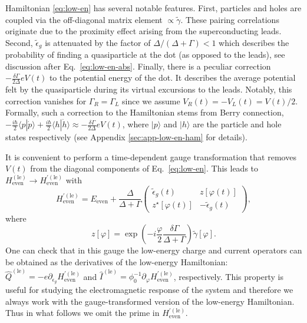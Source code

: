 \documentclass[aps,reprint,longbibliography, prb]{revtex4-2}
\begin{document}
Hamiltonian \eqref{eq:low-en} has several notable features. First, particles and holes are coupled via the off-diagonal matrix element $\propto\tilde{\gamma}$. These pairing correlations originate due to the proximity effect arising from the superconducting leads.  Second, $\tilde{\epsilon}_g$ is attenuated by the factor of $\Delta/(\Delta + \Gamma) < 1$ which describes the probability of finding a quasiparticle at the dot (as opposed to the leads), see discussion after Eq.~\eqref{eq:low-en-abs}.
Finally, there is a peculiar correction $-\frac{\delta\Gamma}{2\Delta}e V(t)$ to the potential energy of the dot. It describes the average potential felt by the quasiparticle during its virtual excursions to the leads. Notably, this correction vanishes for $\Gamma_R=\Gamma_L$ since we assume $V_R(t)=-V_L(t) = V(t)/2$. Formally, such a correction to the Hamiltonian stems from Berry connection, $-\frac{i\hbar}{2}\langle p |\dot{p}\rangle+\frac{i\hbar}{2}\langle h|\dot{h}\rangle \approx -\frac{\delta\Gamma}{2\Delta}e V(t)$, where $|p\rangle$ and $|h\rangle$ are the particle and hole states respectively (see Appendix \ref{sec:app-low-en-ham} for details). 

It is convenient to perform a time-dependent gauge transformation that removes $V(t)$ from the diagonal components of Eq.~\eqref{eq:low-en}. This leads to $H^{(\mathrm{le})}_\mathrm{even} \rightarrow {H}^{\prime(\mathrm{le})}_\mathrm{even}$ with
\begin{equation}
    \label{eq:low-en2}
    H^{\prime(\mathrm{le})}_\mathrm{even} = E_{\mathrm{even}}+ \frac{\Delta}{\Delta + \Gamma}  \begin{pmatrix}
    \tilde{\epsilon}_g(t) & z[\varphi(t)]\\
    z^\star[\varphi(t)] & -\tilde{\epsilon}_g(t)
    \end{pmatrix},
\end{equation}
where
\begin{equation}
\label{eq:z}
z[\varphi] = \exp{\left(-i\frac{\varphi}{2}\frac{\delta\Gamma }{\Delta+\Gamma}\right)}\tilde{\gamma}[\varphi].
\end{equation}
One can check that in this gauge the low-energy charge and current operators can be obtained as the derivatives of the low-energy Hamiltonian: $\hat{Q}^{\mathrm{(le)}} = -e \partial_{\epsilon_g}H^{\prime\mathrm{(le)}}_{\mathrm{even}}$ and $\hat{I}^{\mathrm{(le)}} = \phi_0^{-1} \partial_\varphi H^{\prime\mathrm{(le)}}_\mathrm{even}$, respectively. This property is useful for studying the electromagnetic response of the system and therefore we always work with the gauge-transformed version of the low-energy Hamiltonian. Thus in what follows we omit the prime in $H^{\mathrm{\prime(le)}}_{\mathrm{even}}$.
\end{document}
